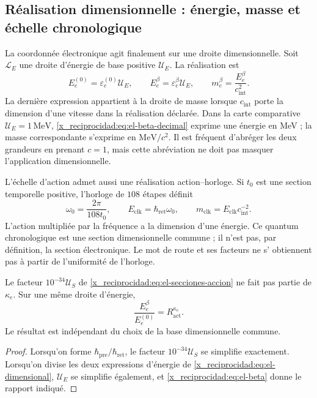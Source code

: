 \subsection{Réalisation dimensionnelle : énergie, masse et échelle chronologique}

La coordonnée électronique agit finalement sur une droite dimensionnelle.
Soit \(\mathcal L_E\) une droite d'énergie de base positive
\(\mathcal U_E\). La réalisation est
\begin{equation}
 E_e^{(0)}=\varepsilon_e^{(0)}\mathcal U_E,\qquad
 E_e^\beta=\varepsilon_e^\beta\mathcal U_E,
 \qquad m_e^\beta=\frac{E_e^\beta}{c_{\mathrm{int}}^2}.
 \label{x_reciprocidad:eq:el-dimensional}
\end{equation}
La dernière expression appartient à la droite de masse lorsque
\(c_{\mathrm{int}}\) porte la dimension d'une vitesse dans la réalisation
déclarée. Dans la carte comparative \(\mathcal U_E=1\,\mathrm{MeV}\),
\eqref{x_reciprocidad:eq:el-beta-decimal} exprime une énergie en MeV ; la masse
correspondante s'exprime en \(\mathrm{MeV}/c^2\). Il est fréquent
d'abréger les deux grandeurs en prenant \(c=1\), mais cette abréviation ne
doit pas masquer l'application dimensionnelle.

L'échelle d'action admet aussi une réalisation action--horloge. Si
\(t_0\) est une section temporelle positive, l'horloge de \(108\) étapes
définit
\begin{equation}
 \omega_0=\frac{2\pi}{108t_0},\qquad
 E_{\mathrm{clk}}=\hbar_{\mathrm{ret}}\omega_0,\qquad
 m_{\mathrm{clk}}=E_{\mathrm{clk}}c_{\mathrm{int}}^{-2}.
 \label{x_reciprocidad:eq:el-cuanto-reloj}
\end{equation}
L'action multipliée par la fréquence a la dimension d'une énergie. Ce quantum
chronologique est une section dimensionnelle commune ; il n'est pas, par définition,
la section électronique. Le mot de route et ses facteurs ne s'
obtiennent pas à partir de l'uniformité de l'horloge.

\begin{proposition}
Le facteur \(10^{-34}\mathcal U_S\) de \eqref{x_reciprocidad:eq:el-secciones-accion} ne fait pas partie de \(\kappa_e\). Sur une même droite d'énergie,
\begin{equation}
 \frac{E_e^\beta}{E_e^{(0)}}=R_{\mathrm{act}}^{\kappa_e}.
 \label{x_reciprocidad:eq:el-razon-energia}
\end{equation}
Le résultat est indépendant du choix de la base dimensionnelle
commune.
\end{proposition}
\begin{proof}
Lorsqu'on forme \(\hbar_{\mathrm{pre}}/\hbar_{\mathrm{ret}}\), le facteur
\(10^{-34}\mathcal U_S\) se simplifie exactement. Lorsqu'on divise les deux
expressions d'énergie de \eqref{x_reciprocidad:eq:el-dimensional}, \(\mathcal U_E\) se simplifie
également, et \eqref{x_reciprocidad:eq:el-beta} donne le rapport indiqué.
\end{proof}

